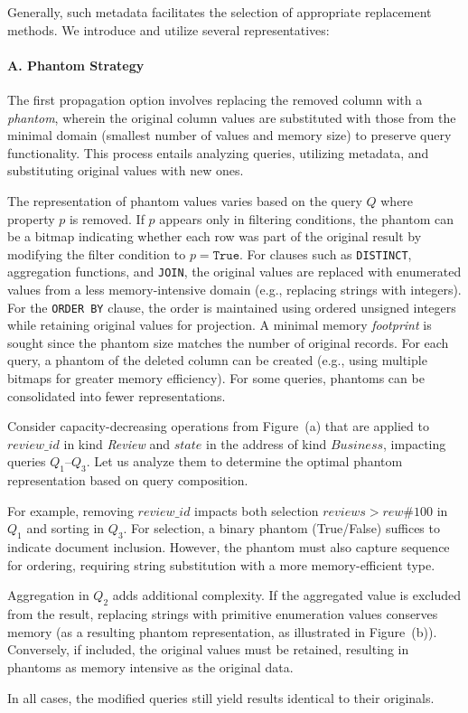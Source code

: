 Generally, such metadata facilitates the selection of appropriate replacement methods. We introduce and utilize several representatives:

\paragraph{A. Phantom Strategy}
The first propagation option involves replacing the removed column with a \textit{phantom}, wherein the original column values are substituted with those from the minimal domain (smallest number of values and memory size) to preserve query functionality. This process entails analyzing queries, utilizing metadata, and substituting original values with new ones.

The representation of phantom values varies based on the query $Q$ where property $p$ is removed. If $p$ appears only in filtering conditions, the phantom can be a bitmap indicating whether each row was part of the original result by modifying the filter condition to $p = \texttt{True}$. For clauses such as \texttt{DISTINCT}, aggregation functions, and \texttt{JOIN}, the original values are replaced with enumerated values from a less memory-intensive domain (e.g., replacing strings with integers). For the \texttt{ORDER BY} clause, the order is maintained using ordered unsigned integers while retaining original values for projection. A minimal memory \textit{footprint} is sought since the phantom size matches the number of original records. For each query, a phantom of the deleted column can be created (e.g., using multiple bitmaps for greater memory efficiency). For some queries, phantoms can be consolidated into fewer representations. %

\begin{example}
Consider capacity-decreasing operations from Figure~(a) that are applied to $review\_id$ in kind \emph{Review} and $state$ in the address of kind $Business$, impacting queries $Q_1$--$Q_3$.
Let us analyze them to %
determine the optimal phantom representation based on query composition.

For example, removing $review\_id$ impacts both selection $reviews > rew\#100$ in $Q_1$ and sorting in $Q_3$. For selection, a binary phantom (True/False) suffices to indicate document inclusion. However, the phantom must also capture sequence for ordering, requiring string substitution with a more memory-efficient type.

Aggregation in $Q_2$ adds additional complexity. If the aggregated value is excluded from the result, replacing strings with primitive enumeration values conserves memory (as a resulting phantom representation, as illustrated in Figure~(b)). Conversely, if included, the original values must be retained, resulting in phantoms as memory intensive as the original data.

In all cases, the modified queries still yield results identical to their originals.
\end{example}

